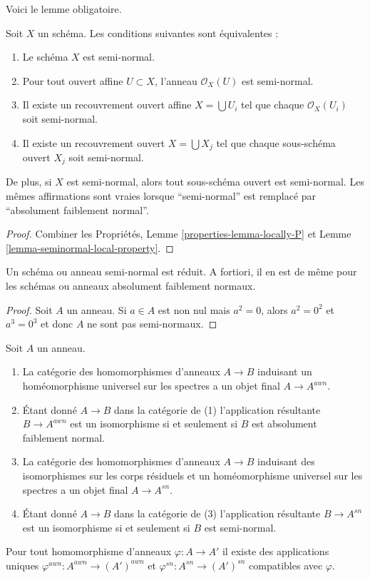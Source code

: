 \noindent
Voici le lemme obligatoire.

\begin{lemma}
\label{lemma-locally-seminormal}
Soit $X$ un schéma. Les conditions suivantes sont équivalentes :
\begin{enumerate}
\item Le schéma $X$ est semi-normal.
\item Pour tout ouvert affine $U \subset X$, l'anneau $\mathcal{O}_X(U)$ est
semi-normal.
\item Il existe un recouvrement ouvert affine $X = \bigcup U_i$ tel que
chaque $\mathcal{O}_X(U_i)$ soit semi-normal.
\item Il existe un recouvrement ouvert $X = \bigcup X_j$ tel que chaque
sous-schéma ouvert $X_j$ soit semi-normal.
\end{enumerate}
De plus, si $X$ est semi-normal, alors
tout sous-schéma ouvert est semi-normal. Les mêmes affirmations
sont vraies lorsque ``semi-normal'' est remplacé par ``absolument
faiblement normal''.
\end{lemma}

\begin{proof}
Combiner les Propriétés, Lemme \ref{properties-lemma-locally-P}
et Lemme \ref{lemma-seminormal-local-property}.
\end{proof}

\begin{lemma}
\label{lemma-seminormal-reduced}
Un schéma ou anneau semi-normal est réduit. A fortiori, il en est de même
pour les schémas ou anneaux absolument faiblement normaux.
\end{lemma}

\begin{proof}
Soit $A$ un anneau.
Si $a \in A$ est non nul mais $a^2 = 0$, alors $a^2 = 0^2$ et $a^3 = 0^3$
et donc $A$ ne sont pas semi-normaux.
\end{proof}

\begin{lemma}
\label{lemma-seminormalization-ring}
Soit $A$ un anneau.
\begin{enumerate}
\item La catégorie des homomorphismes d'anneaux $A \to B$ induisant
un homéomorphisme universel sur les spectres a un objet final $A \to A^{awn}$.
\item Étant donné $A \to B$ dans la catégorie de (1) l'application résultante
$B \to A^{awn}$ est un isomorphisme si et seulement si $B$ est
absolument faiblement normal.
\item La catégorie des homomorphismes d'anneaux $A \to B$ induisant des isomorphismes
sur les corps résiduels et un homéomorphisme universel sur les spectres a un
objet final $A \to A^{sn}$.
\item Étant donné $A \to B$ dans la catégorie de (3) l'application résultante
$B \to A^{sn}$ est un isomorphisme si et seulement si $B$ est semi-normal.
\end{enumerate}
Pour tout homomorphisme d'anneaux $\varphi : A \to A'$ il
existe des applications uniques $\varphi^{awn} : A^{awn} \to (A')^{awn}$
et $\varphi^{sn} : A^{sn} \to (A')^{sn}$ compatibles avec $\varphi$.
\end{lemma}

